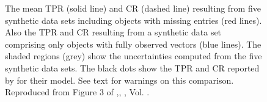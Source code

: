 \begin{figure}[ht!]
\begin{center}
\caption{The mean TPR (solid line) and CR (dashed line) resulting from five synthetic data sets including objects with missing entries (red lines). Also the TPR and CR resulting from a synthetic data set comprising only objects with fully observed vectors (blue lines). The shaded regions (grey) show the uncertainties computed from the five synthetic data sets. The black dots show the TPR and CR reported by \citet{Sarro2014} for their model. See text for warnings on this comparison. Reproduced from Figure 3 of \citet{Olivares2017},\textit{}, , Vol. .}
\label{fig:TPR-CR}
\end{center}
\end{figure}

